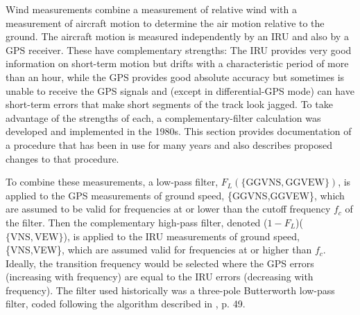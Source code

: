 \documentclass[12pt,twoside,english]{article}\usepackage[]{graphicx}\usepackage[]{color}
\let\OrgIndex\index
\renewcommand*{\index}[1]{\OrgIndex{#1}}
\begin{document}
{{Wind measurements combine a measurement of relative wind with a measurement  of aircraft motion to determine the air motion relative to the ground. The aircraft motion is measured independently by an IRU and also by a GPS receiver. These have complementary strengths: The IRU provides very good information on short-term motion but drifts with a characteristic period of more than an hour, while the GPS provides good absolute accuracy but sometimes is unable to receive the GPS signals and (except in differential-GPS mode) can have short-term errors that make short segments of the track look jagged. To take advantage of the strengths of each, a complementary-filter calculation was developed and implemented in the 1980s. This section provides documentation of a procedure that has been in use for many years and also describes proposed changes to that procedure.

To combine these measurements, a low-pass filter, $F_{L}(\{\mathrm{GGVNS,GGVEW\}})$, is applied to the GPS measurements of ground speed, \{GGVNS,GGVEW\}, which are assumed to be valid for frequencies at or lower than the cutoff frequency $f_{c}$ of the filter. Then the complementary high-pass filter, denoted ($1-F_{L}$)($\{\mathrm{VNS,VEW\}}$), is applied to the IRU measurements of ground speed, \{VNS,VEW\}, which are assumed valid for frequencies at or higher than $f_{c}$. Ideally, the transition frequency would be selected where the GPS errors (increasing with frequency) are equal to the IRU errors (decreasing with frequency). The filter used historically was a three-pole Butterworth low-pass filter, coded following the algorithm described in \citet{Bozic1980}, p. 49. 




}}
\end{document}
